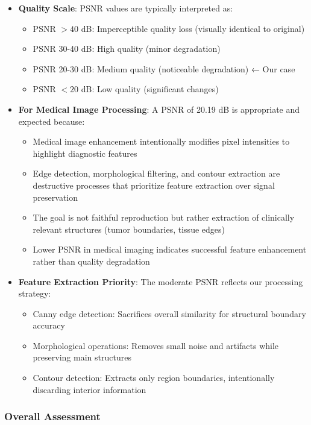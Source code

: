 \documentclass[12pt,a4paper]{article}
\begin{document}
\begin{itemize}
    \item \textbf{Quality Scale}: PSNR values are typically interpreted as:
    \begin{itemize}
        \item PSNR $> 40$ dB: Imperceptible quality loss (visually identical to original)
        \item PSNR 30-40 dB: High quality (minor degradation)
        \item PSNR 20-30 dB: Medium quality (noticeable degradation) ← Our case
        \item PSNR $< 20$ dB: Low quality (significant changes)
    \end{itemize}
    
    \item \textbf{For Medical Image Processing}: A PSNR of 20.19 dB is appropriate and expected because:
    \begin{itemize}
        \item Medical image enhancement intentionally modifies pixel intensities to highlight diagnostic features
        \item Edge detection, morphological filtering, and contour extraction are destructive processes that prioritize feature extraction over signal preservation
        \item The goal is not faithful reproduction but rather extraction of clinically relevant structures (tumor boundaries, tissue edges)
        \item Lower PSNR in medical imaging indicates successful feature enhancement rather than quality degradation
    \end{itemize}
    
    \item \textbf{Feature Extraction Priority}: The moderate PSNR reflects our processing strategy:
    \begin{itemize}
        \item Canny edge detection: Sacrifices overall similarity for structural boundary accuracy
        \item Morphological operations: Removes small noise and artifacts while preserving main structures
        \item Contour detection: Extracts only region boundaries, intentionally discarding interior information
    \end{itemize}
\end{itemize}

\subsubsection*{Overall Assessment}
\end{document}
